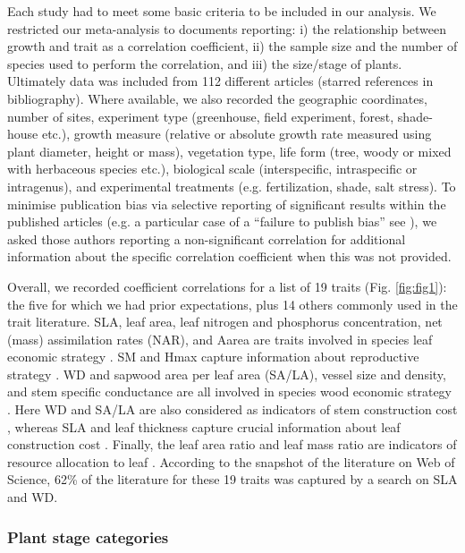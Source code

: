 \documentclass[a4paper,11pt]{article}
\begin{document}
Each study had to meet some basic criteria to be included in our analysis. We restricted our meta-analysis to documents reporting: i) the relationship between growth and trait as a correlation coefficient, ii) the sample size and the number of species used to perform the correlation, and iii) the size/stage of plants. Ultimately data was included from 112 different articles (starred references in bibliography). Where available, we also recorded the geographic coordinates, number of sites, experiment type (greenhouse, field experiment, forest, shade-house etc.), growth measure (relative or absolute growth rate measured using plant diameter, height or mass), vegetation type, life form (tree, woody or mixed with herbaceous species etc.), biological scale (interspecific, intraspecific or intragenus), and experimental treatments (e.g. fertilization, shade, salt stress). To minimise publication bias via selective reporting of significant results within the published articles (e.g. a particular case of a ``failure to publish bias'' see \citealt{Jennions:2013ta}), we asked those authors reporting a non-significant correlation for additional information about the specific correlation coefficient when this was not provided.

Overall, we recorded coefficient correlations for a list of 19 traits (Fig. \ref{fig:fig1}): the five for which we had prior expectations, plus 14 others commonly used in the trait literature. SLA, leaf area, leaf nitrogen and phosphorus concentration, net (mass) assimilation rates (NAR), and Aarea are traits involved in species leaf economic strategy \citep{Wright:2004jb,Wright:2010tp}. SM and Hmax capture information about reproductive strategy \citep{Falster:2005bw,Moles:2006ft}. WD and sapwood area per leaf area (SA/LA), vessel size and density, and stem specific conductance are all involved in species wood economic strategy  \citep{Chave:2009iy}. Here WD and SA/LA are also considered as indicators of stem construction cost \citep{Falster:2011ii}, whereas SLA and leaf thickness capture crucial information about leaf construction cost \citep{Wright:2004jb}. Finally, the leaf area ratio and leaf mass ratio are indicators of resource allocation to leaf \citep{Lambers:1992bj}. According to the snapshot of the literature on Web of Science, 62\% of the literature for these 19 traits was captured by a search on SLA and WD.

\subsubsection*{Plant stage categories}\label{plant-stage-categories}
\end{document}
